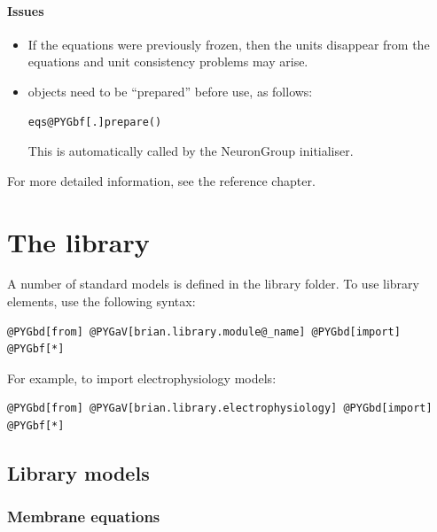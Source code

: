 \documentclass[letterpaper,10pt,english]{manual}
\begin{document}
\subsubsection{Issues}
\begin{itemize}
\item {} 
If the equations were previously frozen, then the units disappear from the equations
and unit consistency problems may arise.

\item {} 
\hyperlink{brian.Equations}{} objects need to be ``prepared'' before use, as follows:

\begin{Verbatim}[commandchars=@\[\]]
eqs@PYGbf[.]prepare()
\end{Verbatim}

This is automatically called by the NeuronGroup initialiser.

\end{itemize}

For more detailed information, see the reference chapter.

\resetcurrentobjects
\hypertarget{--doc-library}{}

\chapter{The library}

A number of standard models is defined in the library folder. To use library elements, use the following syntax:

\begin{Verbatim}[commandchars=@\[\]]
@PYGbd[from] @PYGaV[brian.library.module@_name] @PYGbd[import] @PYGbf[*]
\end{Verbatim}

For example, to import electrophysiology models:

\begin{Verbatim}[commandchars=@\[\]]
@PYGbd[from] @PYGaV[brian.library.electrophysiology] @PYGbd[import] @PYGbf[*]
\end{Verbatim}

\resetcurrentobjects
\hypertarget{--doc-librarymodels}{}

\section{Library models}


\subsection{Membrane equations}
\end{document}
